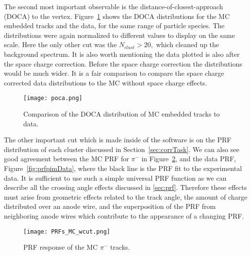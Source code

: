 The second most important observable is the distance-of-closest-approach (DOCA) to the vertex. Figure~\ref{fig:pocacomp} shows the DOCA distributions for the MC embedded tracks and the data, for the same range of particle species. The distributions were again normalized to different values to display on the same scale. Here the only other cut was the $N_{clust} > 20,$ which cleaned up the background spectrum. It is also worth mentioning the data plotted is also after the space charge correction. Before the space charge correction the distributions would be much wider. It is a fair comparison to compare the space charge corrected data distributions to the MC without space charge effects.  

\begin{figure}[!hbt]
\texttt{[image: poca.png]}
\caption{Comparison of the DOCA distribution of MC embedded tracks to data.}
\label{fig:pocacomp}
\end{figure}


The other important cut which is made inside of the software is on the PRF distribution of each cluster discussed in Section~\ref{sec:corrTask}. We can also see good agreement between the MC PRF for $\pi^-$ in Figure~\ref{fig:prfpimMC}, and the data PRF, Figure~\ref{fig:prfpimData}, where the black line is the PRF fit to the experimental data. It is sufficient to use such a simple universal PRF function as we can describe all the crossing angle effects discussed in \ref{sec:prf}. Therefore these effects must arise from geometric effects related to the track angle, the amount of charge distributed over an anode wire, and the superposition of the PRF from neighboring anode wires which contribute to the appearance of a changing PRF.

\begin{figure}[!htb]
         \centering
         \texttt{[image: PRFs\_MC\_wcut.png]}
         \caption{PRF response of the MC $\pi^-$ tracks.}
         \label{fig:prfpimMC}
\end{figure}






